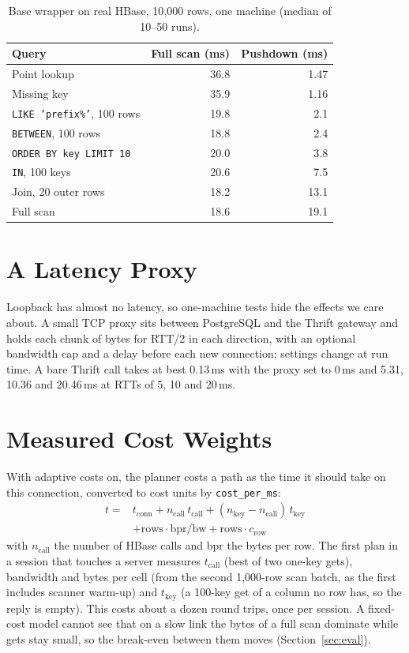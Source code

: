 \documentclass[11pt,a4paper]{article}
\newcommand{\code}[1]{\texttt{#1}}
\begin{document}
\begin{table}[htbp]
\centering\small
\caption{Base wrapper on real HBase, 10{,}000 rows, one machine (median of 10--50 runs).}
\label{tab:base}
\begin{tabularx}{0.8\textwidth}{@{}Xrr@{}}
\toprule
\textbf{Query} & \textbf{Full scan (ms)} & \textbf{Pushdown (ms)}\\
\midrule
Point lookup & 36.8 & 1.47\\
Missing key & 35.9 & 1.16\\
\code{LIKE 'prefix\%'}, 100 rows & 19.8 & 2.1\\
\code{BETWEEN}, 100 rows & 18.8 & 2.4\\
\code{ORDER BY key LIMIT 10} & 20.0 & 3.8\\
\code{IN}, 100 keys & 20.6 & 7.5\\
Join, 20 outer rows & 18.2 & 13.1\\
Full scan & 18.6 & 19.1\\
\bottomrule
\end{tabularx}
\end{table}

\section{A Latency Proxy}
\label{sec:proxy}
Loopback has almost no latency, so one-machine tests hide the effects we care about. A small TCP proxy sits between PostgreSQL and the Thrift gateway and holds each chunk of bytes for RTT/2 in each direction, with an optional bandwidth cap and a delay before each new connection; settings change at run time. A bare Thrift call takes at best 0.13\,ms with the proxy set to 0\,ms and 5.31, 10.36 and 20.46\,ms at RTTs of 5, 10 and 20\,ms.

\section{Measured Cost Weights}
\label{sec:costs}
With adaptive costs on, the planner costs a path as the time it should take on this connection, converted to cost units by \code{cost\_per\_ms}:
\begin{align*}
t = {} & t_{\text{conn}} + n_{\text{call}}\, t_{\text{call}} + (n_{\text{key}} - n_{\text{call}})\, t_{\text{key}}\\
& + \text{rows} \cdot \text{bpr} / \text{bw} + \text{rows} \cdot c_{\text{row}}
\end{align*}
with $n_{\text{call}}$ the number of HBase calls and bpr the bytes per row. The first plan in a session that touches a server measures $t_{\text{call}}$ (best of two one-key gets), bandwidth and bytes per cell (from the second 1{,}000-row scan batch, as the first includes scanner warm-up) and $t_{\text{key}}$ (a 100-key get of a column no row has, so the reply is empty). This costs about a dozen round trips, once per session. A fixed-cost model cannot see that on a slow link the bytes of a full scan dominate while gets stay small, so the break-even between them moves (Section~\ref{sec:eval}).
\end{document}

